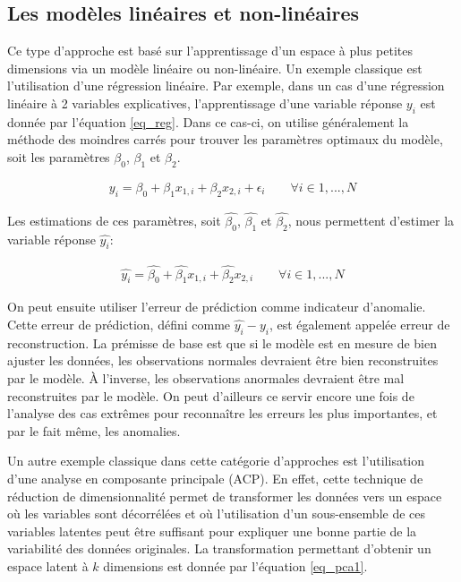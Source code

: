 \subsection{Les modèles linéaires et non-linéaires} \label{soussec:linear}

Ce type d'approche est basé sur l'apprentissage d'un espace à plus petites dimensions via un modèle linéaire ou non-linéaire. Un exemple classique est l'utilisation d'une régression linéaire. Par exemple, dans un cas d'une régression linéaire à 2 variables explicatives, l'apprentissage d'une variable réponse $y_i$ est donnée par l'équation \ref{eq_reg}. Dans ce cas-ci, on utilise généralement la méthode des moindres carrés pour trouver les paramètres optimaux du modèle, soit les paramètres $\beta_0$, $\beta_1$ et $\beta_2$.

\begin{gather}  \label{eq_reg}
y_i = \beta_0 + \beta_{1} x_{1,i} + \beta_2 x_{2,i} + \epsilon_{i} \qquad \forall i \in {1,...,N}
\end{gather}

Les estimations de ces paramètres, soit $\hat{\beta_0}$, $\hat{\beta_1}$ et $\hat{\beta_2}$, nous permettent d'estimer la variable réponse $\hat{y_i}$: 

\begin{gather}  \label{eq_reghat}
\hat{y_i} = \hat{\beta_0} + \hat{\beta_{1}} x_{1,i} + \hat{\beta_2} x_{2,i} \qquad \forall i \in {1,...,N}
\end{gather}

On peut ensuite utiliser l'erreur de prédiction comme indicateur d'anomalie. Cette erreur de prédiction, défini comme $\hat{y_i} - y_i$, est également appelée erreur de reconstruction. La prémisse de base est que si le modèle est en mesure de bien ajuster les données, les observations normales devraient être bien reconstruites par le modèle. À l'inverse, les observations anormales devraient être mal reconstruites par le modèle.  On peut d'ailleurs ce servir encore une fois de l'analyse des cas extrêmes pour reconnaître les erreurs les plus importantes, et par le fait même, les anomalies.
 
Un autre exemple classique dans cette catégorie d'approches est l'utilisation d'une analyse en composante principale (ACP). En effet, cette technique de réduction de dimensionnalité permet de transformer les données vers un espace où les variables sont décorrélées et où l'utilisation d'un sous-ensemble de ces variables latentes peut être suffisant pour expliquer une bonne partie de la variabilité des données originales. La transformation permettant d'obtenir un espace latent à $k$ dimensions est donnée par l'équation \ref{eq_pca1}.
 
